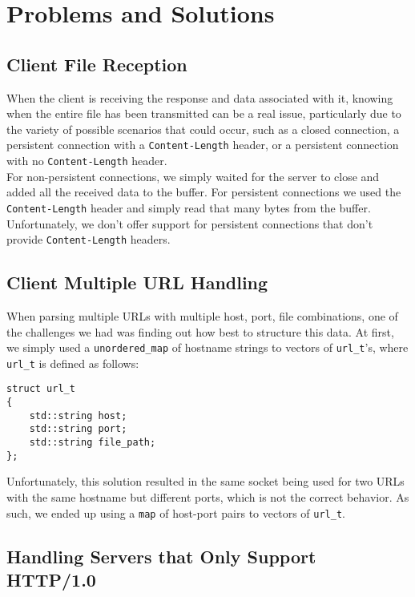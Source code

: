 \documentclass{article}
\begin{document}
\section{Problems and Solutions}

\subsection{Client File Reception}

When the client is receiving the response and data associated with it, knowing when the entire file has been transmitted can be a real issue, particularly due to the variety of possible scenarios that could occur, such as a closed connection, a persistent connection with a \texttt{Content-Length} header, or a persistent connection with no \texttt{Content-Length} header. \\

\noindent
For non-persistent connections, we simply waited for the server to close and added all the received data to the buffer. For persistent connections we used the \texttt{Content-Length} header and simply read that many bytes from the buffer. Unfortunately, we don't offer support for persistent connections that don't provide \texttt{Content-Length} headers.

\subsection{Client Multiple URL Handling}

When parsing multiple URLs with multiple host, port, file combinations, one of the challenges we had was finding out how best to structure this data. At first, we simply used a \texttt{unordered\_map} of hostname strings to vectors of \texttt{url\_t}'s, where \texttt{url\_t} is defined as follows: 

\begin{lstlisting}[style=cstyle]
struct url_t
{
    std::string host;
    std::string port;
    std::string file_path;
};
\end{lstlisting} 

\noindent
Unfortunately, this solution resulted in the same socket being used for two URLs with the same hostname but different ports, which is not the correct behavior. As such, we ended up using a \texttt{map} of host-port pairs to vectors of \texttt{url\_t}.

\subsection{Handling Servers that Only Support HTTP/1.0}
\end{document}
